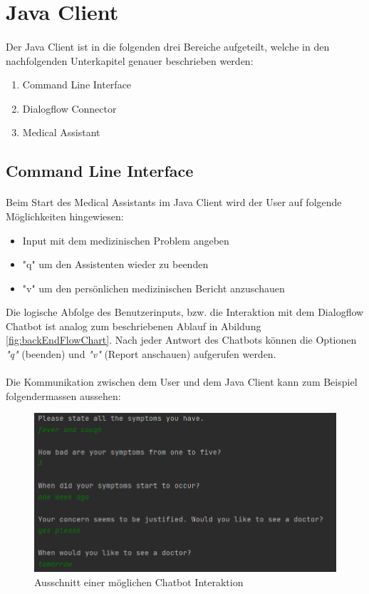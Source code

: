 \documentclass[11pt,a4paper]{article}
\begin{document}
\newpage


\section{Java Client}
	\paragraph{}
		Der Java Client ist in die folgenden drei Bereiche aufgeteilt, welche in den nachfolgenden Unterkapitel genauer beschrieben werden:
		\begin{enumerate}
			\item Command Line Interface
			\item Dialogflow Connector
			\item Medical Assistant
		\end{enumerate}

	\subsection{Command Line Interface}
		\paragraph{}
			Beim Start des Medical Assistants im Java Client wird der User auf folgende Möglichkeiten hingewiesen:
			\begin{itemize}
				\item Input mit dem medizinischen Problem angeben
				\item "q" um den Assistenten wieder zu beenden
				\item "v" um den persönlichen medizinischen Bericht anzuschauen
			\end{itemize}
			Die logische Abfolge des Benutzerinputs, bzw. die Interaktion mit dem Dialogflow Chatbot ist analog zum beschriebenen 
			Ablauf in Abildung \ref{fig:backEndFlowChart}. Nach jeder Antwort des Chatbots können die Optionen \emph{"q"} (beenden) und 
			\emph{"v"} (Report anschauen) aufgerufen werden. \\\\
			Die Kommunikation zwischen dem User und dem Java Client kann zum Beispiel folgendermassen aussehen:
			\begin{figure}[h!]
				\begin{center}
       	    		\includegraphics[width=0.7\linewidth]{JavaClient-ExampleConversation.png}
	    	        \caption{Ausschnitt einer möglichen Chatbot Interaktion}
	        	    \label{fig:javaClient_exampleConversation}
				\end{center}
	        \end{figure}
	
\end{document}
